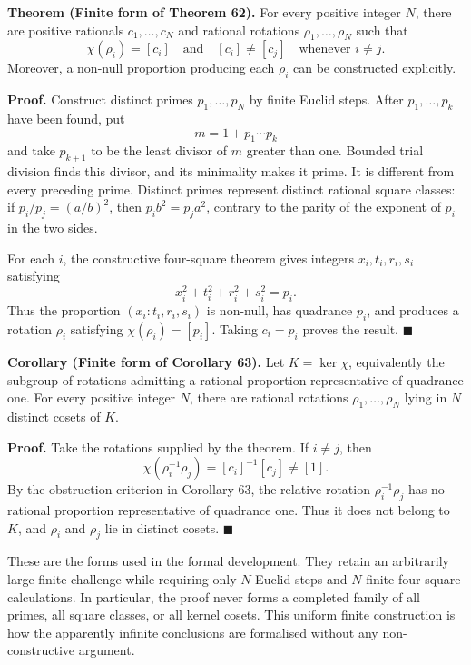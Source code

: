 \documentclass[11pt]{article}
\begin{document}
\medskip
\noindent\textbf{Theorem (Finite form of Theorem 62).}
For every positive integer \(N\), there are positive rationals
\(c_1,\ldots,c_N\) and rational rotations
\(\rho_1,\ldots,\rho_N\) such that
\[
 \chi(\rho_i)=[c_i]
 \quad\text{and}\quad
 [c_i]\ne[c_j]\quad\text{whenever }i\ne j.
\]
Moreover, a non-null proportion producing each \(\rho_i\) can be constructed
explicitly.

\smallskip
\noindent\textbf{Proof.}
Construct distinct primes \(p_1,\ldots,p_N\) by finite Euclid steps.  After
\(p_1,\ldots,p_k\) have been found, put
\[
 m=1+p_1\cdots p_k
\]
and take \(p_{k+1}\) to be the least divisor of \(m\) greater than one.
Bounded trial division finds this divisor, and its minimality makes it prime.
It is different from every preceding prime.  Distinct primes represent
distinct rational square classes: if \(p_i/p_j=(a/b)^2\), then
\(p_i b^2=p_j a^2\), contrary to the parity of the exponent of \(p_i\) in
the two sides.

For each \(i\), the constructive four-square theorem gives integers
\(x_i,t_i,r_i,s_i\) satisfying
\[
 x_i^2+t_i^2+r_i^2+s_i^2=p_i.
\]
Thus the proportion \((x_i:t_i,r_i,s_i)\) is non-null, has quadrance \(p_i\),
and produces a rotation \(\rho_i\) satisfying
\(\chi(\rho_i)=[p_i]\).  Taking \(c_i=p_i\) proves the result.
\hfill\(\blacksquare\)

\medskip
\noindent\textbf{Corollary (Finite form of Corollary 63).}
Let \(K=\ker\chi\), equivalently the subgroup of rotations admitting a
rational proportion representative of quadrance one.  For every positive
integer \(N\), there are rational rotations
\(\rho_1,\ldots,\rho_N\) lying in \(N\) distinct cosets of \(K\).

\smallskip
\noindent\textbf{Proof.}
Take the rotations supplied by the theorem.  If \(i\ne j\), then
\[
 \chi(\rho_i^{-1}\rho_j)=[c_i]^{-1}[c_j]\ne[1].
\]
By the obstruction criterion in Corollary 63, the relative rotation
\(\rho_i^{-1}\rho_j\) has no rational proportion representative of quadrance
one.  Thus it does not belong to \(K\), and \(\rho_i\) and \(\rho_j\) lie in
distinct cosets.
\hfill\(\blacksquare\)

These are the forms used in the formal development.  They retain an
arbitrarily large finite challenge while requiring only \(N\) Euclid steps
and \(N\) finite four-square calculations.  In particular, the proof never
forms a completed family of all primes, all square classes, or all kernel
cosets.  This uniform finite construction is how the apparently infinite
conclusions are formalised without any non-constructive argument.
\end{document}
